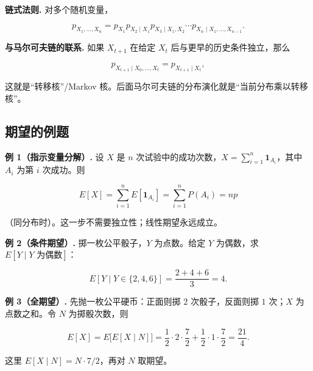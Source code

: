 \textbf{链式法则.} 对多个随机变量，

\[
p_{X_1,\dots,X_n}
=p_{X_1}p_{X_2\mid X_1}p_{X_3\mid X_1,X_2}\cdots
p_{X_n\mid X_1,\dots,X_{n-1}}.
\]

\textbf{与马尔可夫链的联系.} 如果 $X_{t+1}$ 在给定 $X_t$ 后与更早的历史条件独立，那么

\[
p_{X_{t+1}\mid X_0,\dots,X_t}
=p_{X_{t+1}\mid X_t},
\]

这就是“转移核”/Markov 核。后面马尔可夫链的分布演化就是“当前分布乘以转移核”。

\subsection{期望的例题}


\textbf{例 1（指示变量分解）.} 设 $X$ 是 $n$ 次试验中的成功次数，$X=\sum_{i=1}^n\mathbf 1_{A_i}$，其中 $A_i$ 为第 $i$ 次成功。则

\[
E[X]=\sum_{i=1}^nE[\mathbf 1_{A_i}]=\sum_{i=1}^nP(A_i)=np
\]

（同分布时）。这一步不需要独立性；线性期望永远成立。

\textbf{例 2（条件期望）.} 掷一枚公平骰子，$Y$ 为点数。给定 $Y$ 为偶数，求 $E[Y\mid Y\text{ 为偶数}]$：

\[
E[Y\mid Y\in\{2,4,6\}]
=\frac{2+4+6}{3}=4.
\]

\textbf{例 3（全期望）.} 先抛一枚公平硬币：正面则掷 $2$ 次骰子，反面则掷 $1$ 次；$X$ 为点数之和。令 $N$ 为掷骰次数，则

\[
E[X]=E\bigl[E[X\mid N]\bigr]
=\frac12\cdot 2\cdot\frac72+\frac12\cdot 1\cdot\frac72
=\frac{21}{4}.
\]

这里 $E[X\mid N]=N\cdot 7/2$，再对 $N$ 取期望。
